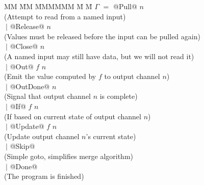 \begin{tabbing}
MM \= MM \= MMMMMM \= M \= M \kill
$\Gamma$ \> $=$ \> @Pull@     \>     \> $n$         \\
         \>     \> (Attempt to read from a named input) \\

         \> $~|$\> @Release@  \>     \> $n$         \\
         \>     \> (Values must be released before the input can be pulled again) \\

         \> $~|$\> @Close@    \>     \> $n$         \\
         \>     \> (A named input may still have data, but we will not read it) \\

         \> $~|$\> @Out@      \> $f$ \> $n$         \\
         \>     \> (Emit the value computed by $f$ to output channel $n$) \\

         \> $~|$\> @OutDone@  \>     \> $n$         \\
         \>     \> (Signal that output channel $n$ is complete) \\

         \> $~|$\> @If@       \> $f$ \> $n$         \\
         \>     \> (If based on current state of output channel $n$) \\

         \> $~|$\> @Update@   \> $f$ \> $n$         \\
         \>     \> (Update output channel $n$'s current state) \\

         \> $~|$\> @Skip@     \>                    \\
         \>     \> (Simple goto, simplifies merge algorithm) \\

         \> $~|$\> @Done@     \>                    \\
         \>     \> (The program is finished) \\
\end{tabbing}


